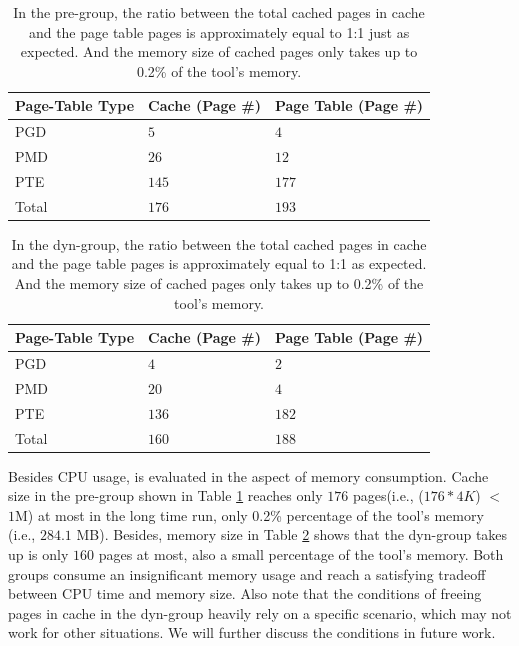 \begin{table}[!ht]
\footnotesize
\begin{center}
\begin{tabular}{|l|l|l|}
\hline
{\textbf{Page-Table Type}} & {\textbf{Cache (Page \#)}} & {\textbf{Page Table (Page \#)}} \\ \hline
PGD & $5$  & $4$ \\ \hline
PMD & $26$ & $12$ \\ \hline
PTE & $145$ & $177$ \\ \hline
Total & $176$ & $193$ \\ \hline
\end{tabular}
\end{center}
\caption{In the pre-\name group, the ratio between the total cached pages in cache and the page table pages is approximately equal to 1:1 just as expected. And the memory size of cached pages only takes up to 0.2\% of the tool's memory.}
\label{tab:prePGpool}
\end{table}

\begin{table}[!ht]
\footnotesize
\begin{center}
\begin{tabular}{|l|l|l|}
\hline
{\textbf{Page-Table Type}} & {\textbf{Cache (Page \#)}} & {\textbf{Page Table (Page \#)}} \\ \hline
PGD & $4$  & $2$ \\ \hline
PMD & $20$ & $4$  \\ \hline
PTE & $136$ & $182$ \\ \hline
Total & $160$ & $188$ \\ \hline
\end{tabular}
\end{center}
\caption{In the dyn-\name group, the ratio between the total cached pages in cache and the page table pages is approximately equal to 1:1 as expected. And the memory size of cached pages only takes up to 0.2\% of the tool's memory.}
\label{tab:dynPGpool}
\end{table}

Besides CPU usage, \name is evaluated in the aspect of memory consumption. Cache size in the pre-\name group shown in Table \ref{tab:prePGpool} reaches only $176$ pages(i.e., ($176 * 4K$) $<$ $1$M) at most in the long time run, only 0.2\% percentage of the tool's memory (i.e., $284.1$ MB). Besides, memory size in Table \ref{tab:dynPGpool} shows that the dyn-\name group takes up is only $160$ pages at most, also a small percentage of the tool's memory. Both groups consume an insignificant memory usage and reach a satisfying tradeoff between CPU time and memory size. Also note that the conditions of freeing pages in cache in the dyn-\name group heavily rely on a specific scenario, which may not work for other situations. We will further discuss the conditions in future work.

